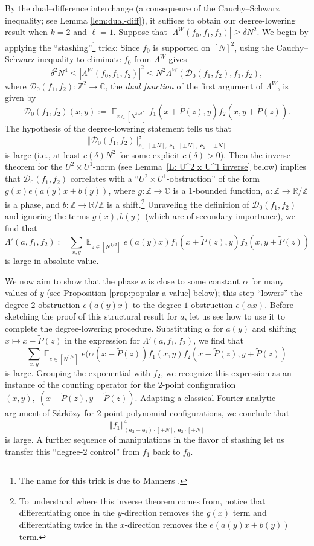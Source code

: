 \documentclass[11pt]{amsart}
\theoremstyle{definition}
\DeclareMathOperator*{\E}{\mathbb{E}}
\newcommand{\C}{{\mathbb C}}
\newcommand{\R}{{\mathbb R}}
\newcommand{\Z}{{\mathbb Z}}
\newcommand{\be}{{\mathbf{e}}}
\newcommand{\norm}[1]{\left\Vert #1\right\Vert}
\newcommand{\abs}[1]{\mathopen{}\left| #1\mathclose{}\right|}
\begin{document}
By the dual--difference interchange (a consequence of the Cauchy--Schwarz inequality; see Lemma \ref{lem:dual-diff}), it suffices to obtain our degree-lowering result when $k=2$ and $\ell=1$.  Suppose that $|\Lambda^W(f_0,f_1,f_2)| \geq \delta N^2$.  We begin by applying the ``stashing''\footnote{The name for this trick is due to Manners \cite{Man21}.} trick: Since $f_0$ is supported on $[N]^2$, using the Cauchy--Schwarz inequality to eliminate $f_0$ from $\Lambda^W$ gives
$$\delta^2 N^4 \leq \abs{\Lambda^W(f_0,f_1,f_2)}^2 \leq N^2 \Lambda^W(\mathcal{D}_0(f_1,f_2),f_1,f_2),$$
where $\mathcal{D}_0(f_1,f_2):\mathbb{Z}^2 \to \mathbb{C}$, the \emph{dual function} of the first argument of $\Lambda^W$, is given by
$$\mathcal{D}_0(f_1,f_2)(x,y):=\E_{z \in [N^{1/d}]} f_1(x+\widetilde P(z),y)f_2(x,y+\widetilde P(z)).$$
The hypothesis of the degree-lowering statement tells us that
$$\norm{\mathcal{D}_0(f_1,f_2)}_{\be_1\cdot [\pm N],\; \be_1\cdot [\pm N],\; \be_2\cdot [\pm N]}^8$$
is large (i.e., at least $c(\delta)N^2$ for some explicit $c(\delta)>0$).  Then the inverse theorem for the $U^2 \times U^1$-norm (see Lemma~\ref{L: U^2 x U^1 inverse} below) implies that $\mathcal{D}_0(f_1,f_2)$ correlates with a ``$U^2 \times U^1$-obstruction'' of the form $g(x)e(a(y)x+b(y))$, where $g: \Z \to \C$ is a $1$-bounded function, $a:\Z \to \R/\Z$ is a phase, and $b:\Z \to \R/\Z$ is a shift.\footnote{To understand where this inverse theorem comes from, notice that differentiating once in the $y$-direction removes the $g(x)$ term and differentiating twice in the $x$-direction removes the $e(a(y)x+b(y))$ term.}  
Unraveling the definition of $\mathcal{D}_0(f_1,f_2)$ and ignoring the terms $g(x),b(y)$ (which are of secondary importance), we find that
$$\Lambda'(a,f_1,f_2):=\sum_{x,y} \E_{z \in [N^{1/d}]}e(a(y)x)f_1(x+\widetilde P(z),y)f_2(x,y+\widetilde P(z))$$
is large in absolute value.

We now aim to show that the phase $a$ is close to some constant $\alpha$ for many values of $y$ (see Proposition \ref{prop:popular-a-value} below); this step ``lowers'' the degree-$2$ obstruction $e(a(y)x)$ to the degree-$1$ obstruction $e(\alpha x)$.  Before sketching the proof of this structural result for $a$, let us see how to use it to complete the degree-lowering procedure.  Substituting $\alpha$ for $a(y)$ and shifting $x \mapsto x-\widetilde P(z)$ in the expression for $\Lambda'(a,f_1,f_2)$, we find that
$$\sum_{x,y} \E_{z \in [N^{1/d}]} e(\alpha (x-\widetilde P(z))f_1(x,y)f_2(x-\widetilde P(z),y+\widetilde P(z))$$
is large.  Grouping the exponential with $f_2$, we recognize this expression as an instance of the counting operator for the $2$-point configuration $(x,y),\; (x-\widetilde P(z),y+\widetilde P(z))$.  Adapting a classical Fourier-analytic argument of S\'ark\"ozy \cite{Sa78a, Sa78b} for $2$-point polynomial configurations, we conclude that $$\norm{f_1}_{(\be_2-\be_1)\cdot[\pm N],\; \be_2\cdot [\pm N]}^4$$
is large.  A further sequence of manipulations in the flavor of stashing let us transfer this ``degree-$2$ control'' from $f_1$ back to $f_0$.  
\end{document}
